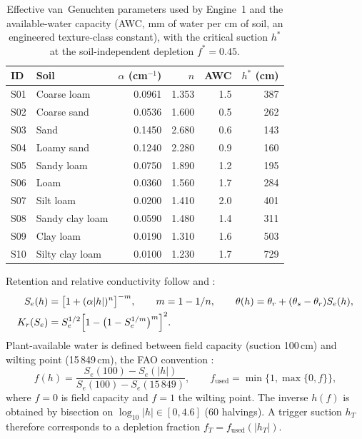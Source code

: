\documentclass[preprint,12pt]{elsarticle}
\begin{document}
\begin{table}[H]\centering\small
\caption{Effective van~Genuchten parameters used by Engine~1 and the available-water capacity (AWC, mm of water per cm of soil, an engineered texture-class constant), with the critical suction $h^\ast$ at the soil-independent depletion $f^\ast=0.45$.}
\label{tab:soilsP3}
\begin{tabular}{llrrrr}
\toprule
ID & Soil & $\alpha$ (cm$^{-1}$) & $n$ & AWC & $h^\ast$ (cm)\\\midrule
S01 & Coarse loam & 0.0961 & 1.353 & 1.5 & 387\\
S02 & Coarse sand & 0.0536 & 1.600 & 0.5 & 262\\
S03 & Sand & 0.1450 & 2.680 & 0.6 & 143\\
S04 & Loamy sand & 0.1240 & 2.280 & 0.9 & 160\\
S05 & Sandy loam & 0.0750 & 1.890 & 1.2 & 195\\
S06 & Loam & 0.0360 & 1.560 & 1.7 & 284\\
S07 & Silt loam & 0.0200 & 1.410 & 2.0 & 401\\
S08 & Sandy clay loam & 0.0590 & 1.480 & 1.4 & 311\\
S09 & Clay loam & 0.0190 & 1.310 & 1.6 & 503\\
S10 & Silty clay loam & 0.0100 & 1.230 & 1.7 & 729\\\bottomrule
\end{tabular}
\end{table}

Retention and relative conductivity follow \cite{vanGenuchten1980} and \cite{Mualem1976}:
\begin{align}
S_e(h)&=\bigl[1+(\alpha|h|)^{n}\bigr]^{-m},\qquad m=1-1/n,\qquad \theta(h)=\theta_r+(\theta_s-\theta_r)S_e(h),\label{eq:vgP3}\\
K_r(S_e)&=S_e^{1/2}\Bigl[1-\bigl(1-S_e^{1/m}\bigr)^{m}\Bigr]^{2}. \label{eq:mualemP3}
\end{align}
Plant-available water is defined between field capacity (suction 100\,cm) and wilting point (15\,849\,cm), the FAO convention \cite{Allen1998}:
\begin{equation}
f(h)=\frac{S_e(100)-S_e(|h|)}{S_e(100)-S_e(15\,849)},\qquad f_{\mathrm{used}}=\min\{1,\max\{0,f\}\},
\label{eq:depl}
\end{equation}
where $f=0$ is field capacity and $f=1$ the wilting point. The inverse $h(f)$ is obtained by bisection on $\log_{10}|h|\in[0,4.6]$ (60 halvings). A trigger suction $h_T$ therefore corresponds to a depletion fraction $f_T=f_{\mathrm{used}}(|h_T|)$.
\end{document}
